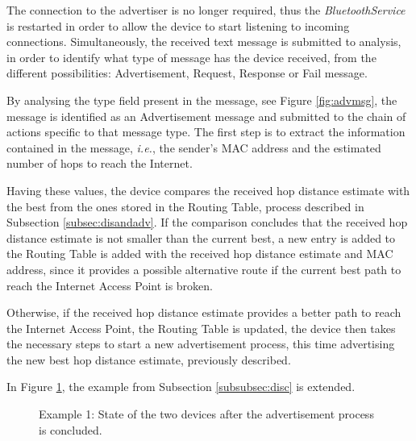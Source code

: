 The connection to the advertiser is no longer required, thus the \textit{BluetoothService} is restarted in order to allow the device to start listening to incoming connections. Simultaneously, the received text message is submitted to analysis, in order to identify what type of message has the device received, from the different possibilities: Advertisement, Request, Response or Fail message.

By analysing the type field present in the message, see Figure \ref{fig:advmsg}, the message is identified as an Advertisement message and submitted to the chain of actions specific to that message type. The first step is to extract the information contained in the message, \textit{i.e.}, the sender's \gls{MAC} address and the estimated number of hops to reach the Internet.

Having these values, the device compares the received hop distance estimate with the best from the ones stored in the Routing Table, process described in Subsection \ref{subsec:disandadv}. If the comparison concludes that the received hop distance estimate is not smaller than the current best, a new entry is added to the Routing Table is added with the received hop distance estimate and \gls{MAC} address, since it provides a possible alternative route if the current best path to reach the Internet Access Point is broken.

Otherwise, if the received hop distance estimate provides a better path to reach the Internet Access Point, the Routing Table is updated, the device then takes the necessary steps to start a new advertisement process, this time advertising the new best hop distance estimate, previously described. 

In Figure \ref{fig:adveg2}, the example from Subsection \ref{subsubsec:disc} is extended.

\begin{figure}[ht]
   \noindent{}
	\caption{\label{fig:adveg2} Example 1: State of the two devices after the advertisement process is concluded.} 
\end{figure}

